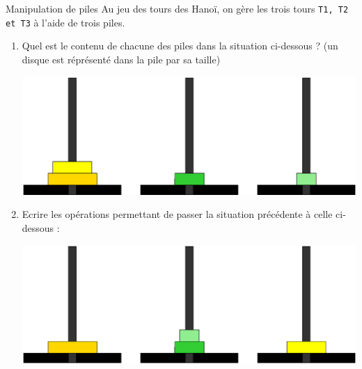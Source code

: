 \documentclass[10pt]{beamer}
\begin{document}
\begin{frame}{\Ctitle}{\stitle}
	\begin{exampleblock}{Manipulation de piles}
		Au jeu des tours des Hanoï, on gère les trois tours {\tt T1, T2 et T3} à l'aide de trois piles.
		\begin{enumerate}
			\item<2-> Quel est le contenu de chacune des piles dans la situation ci-dessous ? (un disque est réprésenté dans la pile par sa taille)
				\begin{center}
					\includegraphics[scale=0.14]{hanoi_dep.eps}
				\end{center}
			\item<3-> Ecrire les opérations permettant de passer la situation précédente à celle ci-dessous :
				\begin{center}
					\includegraphics[scale=0.18]{hanoi_fin.eps}
				\end{center}
		\end{enumerate}
	\end{exampleblock}
\end{frame}
\end{document}

